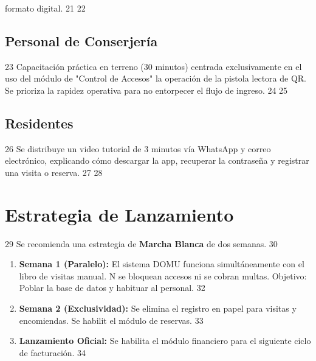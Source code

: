       formato digital.
   21
   22 \subsection{Personal de Conserjería}
   23 Capacitación práctica en terreno (30 minutos) centrada exclusivamente en el uso del módulo de "Control de Accesos"
      la operación de la pistola lectora de QR. Se prioriza la rapidez operativa para no entorpecer el flujo de ingreso.
   24
   25 \subsection{Residentes}
   26 Se distribuye un video tutorial de 3 minutos vía WhatsApp y correo electrónico, explicando cómo descargar la app,
      recuperar la contraseña y registrar una visita o reserva.
   27
   28 \section{Estrategia de Lanzamiento}
   29 Se recomienda una estrategia de \textbf{Marcha Blanca} de dos semanas.
   30 \begin{enumerate}
   31     \item \textbf{Semana 1 (Paralelo):} El sistema DOMU funciona simultáneamente con el libro de visitas manual. N
      se bloquean accesos ni se cobran multas. Objetivo: Poblar la base de datos y habituar al personal.
   32     \item \textbf{Semana 2 (Exclusividad):} Se elimina el registro en papel para visitas y encomiendas. Se habilit
      el módulo de reservas.
   33     \item \textbf{Lanzamiento Oficial:} Se habilita el módulo financiero para el siguiente ciclo de facturación.
   34 \end{enumerate}